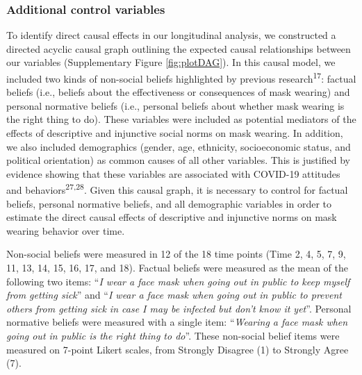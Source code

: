 \documentclass[
  man, donotrepeattitle,floatsintext]{apa6}
\begin{document}
\hypertarget{additional-control-variables}{%
\subsubsection{Additional control variables}\label{additional-control-variables}}

To identify direct causal effects in our longitudinal analysis, we constructed a directed acyclic causal graph outlining the expected causal relationships between our variables (Supplementary Figure \ref{fig:plotDAG}). In this causal model, we included two kinds of non-social beliefs highlighted by previous research\textsuperscript{17}: factual beliefs (i.e., beliefs about the effectiveness or consequences of mask wearing) and personal normative beliefs (i.e., personal beliefs about whether mask wearing is the right thing to do). These variables were included as potential mediators of the effects of descriptive and injunctive social norms on mask wearing. In addition, we also included demographics (gender, age, ethnicity, socioeconomic status, and political orientation) as common causes of all other variables. This is justified by evidence showing that these variables are associated with COVID-19 attitudes and behaviors\textsuperscript{27,28}. Given this causal graph, it is necessary to control for factual beliefs, personal normative beliefs, and all demographic variables in order to estimate the direct causal effects of descriptive and injunctive norms on mask wearing behavior over time.

Non-social beliefs were measured in 12 of the 18 time points (Time 2, 4, 5, 7, 9, 11, 13, 14, 15, 16, 17, and 18). Factual beliefs were measured as the mean of the following two items: ``\emph{I wear a face mask when going out in public to keep myself from getting sick}'' and ``\emph{I wear a face mask when going out in public to prevent others from getting sick in case I may be infected but don't know it yet}''. Personal normative beliefs were measured with a single item: ``\emph{Wearing a face mask when going out in public is the right thing to do}''. These non-social belief items were measured on 7-point Likert scales, from Strongly Disagree (1) to Strongly Agree (7).
\end{document}
